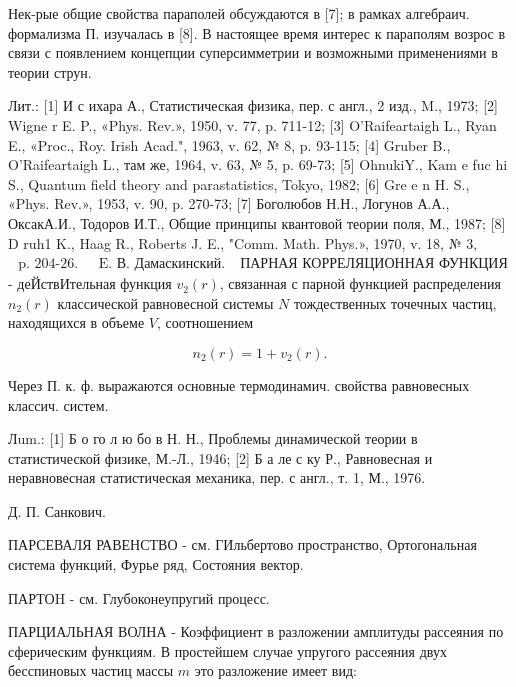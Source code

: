 \documentclass[10pt]{article}
\begin{document}
Нек-рые общие свойства параполей обсуждаются в [7]; в рамках алгебраич. формализма П. изучалась в [8]. В настоящее время интерес к параполям возрос в связи с появлением концепции суперсимметрии и возможными применениями в теории струн.



Лит.: [1] И с ихара А., Статистическая физика, пер. с англ., 2 изд., M., 1973; [2] Wigne r E. P., «Phys. Rev.», 1950, v. 77, p. 711-12; [3] O'Raifeartaigh L., Ryan E., «Proc., Roy. Irish Acad.", 1963, v. 62, № 8, p. 93-115; [4] Gruber B., O'Raifeartaigh L., там же, 1964, v. 63, № 5, p. 69-73; [5] OhnukiY., $\mathrm{Kam}$ e fuc $\mathrm{hi}$ S., Quantum field theory and parastatistics, Tokyo, 1982; [6] Gre e n H. S., «Phys. Rev.», 1953, v. 90, p. 270-73; [7] Боголюбов Н.Н., Логунов А.А., ОксакА.И., Тодоров И.Т., Общие принципы квантовой теории поля, М., 1987; [8] D ruh1 K., Haag R., Roberts J. E., "Comm. Math. Phys.», 1970, v. 18, № 3, $\begin{array}{ll}\text { p. 204-26. } & \text { E. В. Дамаскинский. }\end{array}$ ПАРНАЯ КОРРЕЛЯЦИОННАЯ ФУНКЦИЯ - деЙствИтельная функция $v_{2}(r)$, связанная с парной функцией распределения $n_{2}(r)$ классической равновесной системы $N$ тождественных точечных частиц, находящихся в объеме $V$, соотношением



\[

n_{2}(r)=1+v_{2}(r) .

\]



Через П. к. ф. выражаются основные термодинамич. свойства равновесных классич. систем.



Лum.: [1] Б о го л ю бо в Н. Н., Проблемы динамической теории в статистической физике, М.-Л., 1946; [2] Б а ле с ку Р., Равновесная и неравновесная статистическая механика, пер. с англ., т. 1, М., 1976.



Д. П. Санкович.



ПАРСЕВАЛЯ РАВЕНСТВО - см. ГИльбертово пространство, Ортогональная система функций, Фурье ряд, Состояния вектор.



ПАРТОH - см. Глубоконеупругий процесс.



ПАРЦИАЛЬНАЯ ВОЛНА - Коэффициент в разложении амплитуды рассеяния по сферическим функциям. В простейшем случае упругого рассеяния двух бесспиновых частиц массы $m$ это разложение имеет вид:
\end{document}
